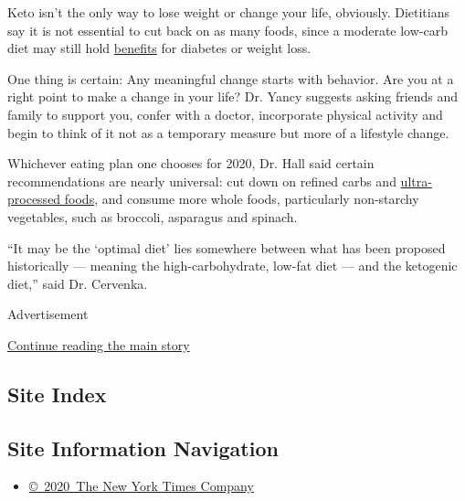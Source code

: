 Keto isn't the only way to lose weight or change your life, obviously.
Dietitians say it is not essential to cut back on as many foods, since a
moderate low-carb diet may still hold
\href{https://doi.org/10.1038/s41430-017-0019-4}{benefits} for diabetes
or weight loss.

One thing is certain: Any meaningful change starts with behavior. Are
you at a right point to make a change in your life? Dr. Yancy suggests
asking friends and family to support you, confer with a doctor,
incorporate physical activity and begin to think of it not as a
temporary measure but more of a lifestyle change.

Whichever eating plan one chooses for 2020, Dr. Hall said certain
recommendations are nearly universal: cut down on refined carbs and
\href{https://www.cell.com/cell-metabolism/fulltext/S1550-4131(19)30248-7?_returnURL=https\%3A\%2F\%2Flinkinghub.elsevier.com\%2Fretrieve\%2Fpii\%2FS1550413119302487\%3Fshowall\%3Dtrue}{ultra-processed
foods}, and consume more whole foods, particularly non-starchy
vegetables, such as broccoli, asparagus and spinach.

``It may be the `optimal diet' lies somewhere between what has been
proposed historically --- meaning the high-carbohydrate, low-fat diet
--- and the ketogenic diet,'' said Dr. Cervenka.

Advertisement

\protect\hyperlink{after-bottom}{Continue reading the main story}

\hypertarget{site-index}{%
\subsection{Site Index}\label{site-index}}

\hypertarget{site-information-navigation}{%
\subsection{Site Information
Navigation}\label{site-information-navigation}}

\begin{itemize}
\tightlist
\item
  \href{https://help.nytimes.com/hc/en-us/articles/115014792127-Copyright-notice}{©~2020~The
  New York Times Company}
\end{itemize}

